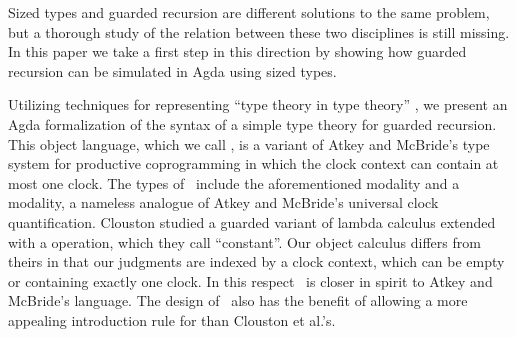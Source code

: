 



Sized types and guarded recursion are different solutions to the same
problem, but a thorough study of the relation between these two
disciplines is still missing. In this paper we take a first step in
this direction by showing how guarded recursion can be simulated in
Agda using sized types. 

Utilizing techniques for representing ``type theory in type theory''
\cite{AltenkirchK16,Chapman09}, we present an Agda formalization of
the syntax of a simple type theory for guarded recursion. This object
language, which we call \GTT, is a variant of Atkey and McBride's type
system for productive coprogramming \cite{atkey2013productive} in
which the clock context can contain at most one clock. The types of
\GTT\ include the aforementioned  modality and a  modality,
a nameless analogue of Atkey and McBride's universal clock
quantification. Clouston \etal \cite{CloustonBGB15} studied a
guarded variant of lambda calculus extended with a  operation,
which they call ``constant''.  Our object calculus differs from
theirs in that our judgments are indexed by a clock context, which can
be empty or containing exactly one clock. In this respect \GTT\ is
closer in spirit to Atkey and McBride's language. The design of \GTT\
also has the benefit of allowing a more appealing introduction rule for
\IC{□} than Clouston et al.'s.


